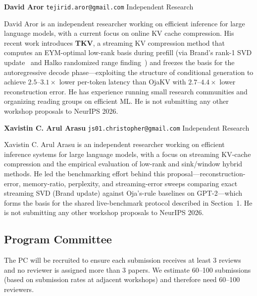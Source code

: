 \documentclass{article}
\begin{document}
\textbf{David Aror} \quad \texttt{tejirid.aror@gmail.com} \quad Independent Research

David Aror is an independent researcher working on efficient inference for large
language models, with a current focus on online KV cache compression.  His recent
work introduces \textbf{TKV}, a streaming KV compression method that computes
an EYM-optimal low-rank basis during prefill (via Brand's rank-1 SVD
update~\cite{brand2006} and Halko randomized range finding~\cite{halko2011})
and freezes the basis for the autoregressive decode
phase---exploiting the structure of conditional generation to achieve $2.5$--$3.1\times$
lower per-token latency than OjaKV with $2.7$--$4.4\times$ lower reconstruction error.
He has experience running small research communities and organizing reading groups
on efficient ML.  He is not submitting any other workshop proposals to NeurIPS 2026.

\textbf{Xavistin C. Arul Arasu} \quad \texttt{js01.christopher@gmail.com} \quad Independent Research

Xavistin C. Arul Arasu is an independent researcher working on efficient inference
systems for large language models, with a focus on streaming KV-cache compression
and the empirical evaluation of low-rank and sink/window hybrid methods.  He led the
benchmarking effort behind this proposal---reconstruction-error, memory-ratio,
perplexity, and streaming-error sweeps comparing exact streaming SVD (Brand update)
against Oja's-rule baselines on GPT-2---which forms the basis for the shared
live-benchmark protocol described in Section~1.  He is not submitting any other
workshop proposals to NeurIPS 2026.


\subsection*{Program Committee}

The PC will be recruited to ensure each submission receives at least 3 reviews and
no reviewer is assigned more than 3 papers.  We estimate 60--100 submissions
(based on submission rates at adjacent workshops) and therefore need 60--100
reviewers.
\end{document}
